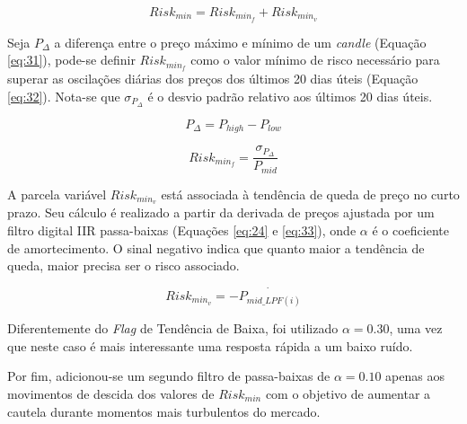 \begin{itemize}
    \begin{equation} \label{eq:30}
        Risk_{min} = Risk_{min_f} + Risk_{min_v}
    \end{equation}

    Seja \begin{math} P_{\Delta} \end{math} a diferença entre o preço máximo e mínimo de um \textit{candle} (Equação \ref{eq:31}), pode-se definir \begin{math} Risk_{min_f} \end{math} como o valor mínimo de risco necessário para superar as oscilações diárias dos preços dos últimos 20 dias úteis (Equação \ref{eq:32}). Nota-se que \begin{math} \sigma_{P_{\Delta}} \end{math} é o desvio padrão relativo aos últimos 20 dias úteis.

    \begin{equation} \label{eq:31}
        P_{\Delta} = P_{high} - P_{low}
    \end{equation}

    \begin{equation} \label{eq:32}
        Risk_{min_f} = \dfrac{ \sigma_{P_{\Delta}} }{ P_{mid} }
    \end{equation}

    A parcela variável \begin{math} Risk_{min_v} \end{math} está associada à tendência de queda de preço no curto prazo. Seu cálculo é realizado a partir da derivada de preços ajustada por um filtro digital IIR passa-baixas (Equações \ref{eq:24} e \ref{eq:33}), onde \begin{math} \alpha \end{math} é o coeficiente de amortecimento. O sinal negativo indica que quanto maior a tendência de queda, maior precisa ser o risco associado.

    \begin{equation} \label{eq:33}
        Risk_{min_v} = - \dot{P_{mid\_LPF(i)}}
    \end{equation}

    Diferentemente do \textit{Flag} de Tendência de Baixa, foi utilizado \begin{math} \alpha = 0.30 \end{math}, uma vez que neste caso é mais interessante uma resposta rápida a um baixo ruído.

    Por fim, adicionou-se um segundo filtro de passa-baixas de \begin{math} \alpha = 0.10 \end{math} apenas aos movimentos de descida dos valores de \begin{math} Risk_{min} \end{math} com o objetivo de aumentar a cautela durante momentos mais turbulentos do mercado.


\end{itemize}
